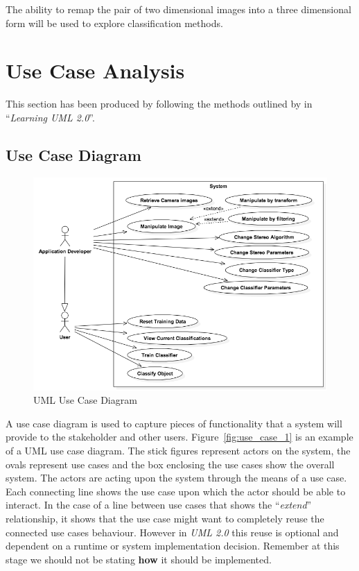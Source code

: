 \documentclass[11pt,oneside]{report}
\begin{document}
			The ability to remap the pair of two dimensional images into a three dimensional form will be used to explore classification methods.
			
		\section{Use Case Analysis}
		This section has been produced by following the methods outlined by  in ``\textit{Learning UML 2.0}''.
			\subsection{Use Case Diagram}
			
			\begin{figure}
			\centering
    				\includegraphics[width=\textwidth]{use_case_1}
    			\caption{UML Use Case Diagram \protect {\label{fig:use_case_1}}}

			\end{figure}	
			A use case diagram is used to capture pieces of functionality that a system will provide to the stakeholder and other users.
			Figure~\ref{fig:use_case_1} is an example of a UML use case diagram.
			The stick figures represent actors on the system, the ovals represent use cases and the box enclosing the use cases show the overall system. 
			The actors are acting upon the system through the means of a use case.
			Each connecting line shows the use case upon which the actor should be able to interact.
			In the case of a line between use cases that shows the ``\textit{extend}'' relationship, it shows that the use case might want to completely reuse the connected use cases behaviour.
			However in \textit{UML 2.0} this reuse is optional and dependent on a runtime or system implementation decision.
			Remember at this stage we should not be stating \textbf{how} it should be implemented.
\end{document}
